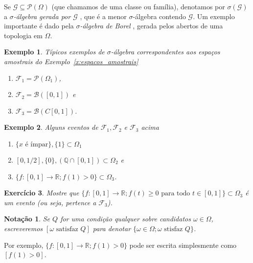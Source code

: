 \documentclass[reqno, final]{book}
\newcommand*\1{\mathds{1}}
\newtheorem{notation}[theorem]{Notação}
\newtheorem{example}{Exemplo}[section]
\newtheorem{exercise}[example]{Exercício}
\begin{document}
Se $\mathcal{G} \subseteq \mathcal{P}(\Omega)$ (que chamamos de uma classe ou família), denotamos por $\sigma(\mathcal{G})$ a \emph{$\sigma$-álgebra gerada por $\mathcal{G}$} , que é a menor $\sigma$-álgebra contendo $\mathcal{G}$.
Um exemplo importante é dado pela \emph{$\sigma$-álgebra de Borel} , gerada pelos abertos de uma topologia em $\Omega$.

\begin{example} Típicos exemplos de $\sigma$-álgebra correspondentes aos espaços amostrais do Exemplo~\ref{x:espacos_amostrais}
  \begin{enumerate}[\quad a)]
  \item $\mathcal{F}_1 = \mathcal{P}(\Omega_1)$,
  \item $\mathcal{F}_2 = \mathcal{B}([0,1])$ e
  \item $\mathcal{F}_3 = \mathcal{B}(C[0,1])$.
  \end{enumerate}
\end{example}

\begin{example} Alguns eventos de $\mathcal{F}_1, \mathcal{F}_2$ e $\mathcal{F}_3$ acima
  \begin{enumerate}[\quad a)]
  \item $\{\text{$x$ é ímpar}\}, \{1\} \subset \Omega_1$
  \item $[0,1/2], \{0\}, (\mathbb{Q} \cap [0,1]) \subset \Omega_2$ e
  \item $\{f:[0,1] \to \mathbb{R}; f(1) > 0\} \subset \Omega_3$.
  \end{enumerate}
\end{example}

\begin{exercise}
  Mostre que $\{f:[0,1] \to \mathbb{R}; f(t) \geq 0 \text{ para todo $t \in [0,1]$}\} \subset \Omega_3$ é um evento (ou seja, pertence a $\mathcal{F}_3$).
\end{exercise}

\begin{notation}
  Se $Q$ for uma condição qualquer sobre candidatos $\omega \in \Omega$, escreveremos $[\text{$\omega$ satisfaz $Q$}]$  para denotar $\{\omega \in \Omega; \text{$\omega$ stisfaz $Q$}\}$.
\end{notation}

Por exemplo, $\{f:[0,1] \to \mathbb{R}; f(1) > 0\}$ pode ser escrita simplesmente como $[f(1) > 0]$.
\end{document}
